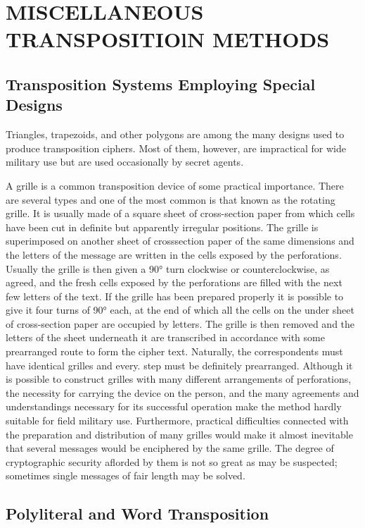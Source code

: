 \section{MISCELLANEOUS TRANSPOSITIOlN METHODS}
\subsection{Transposition Systems Employing Special Designs}

\mypara Triangles, trapezoids, and other polygons are among the many
designs used to produce transposition ciphers. Most of them, however,
are impractical for wide military use but are used occasionally by secret
agents.

\mypara A grille is a common transposition device of some practical importance. There are several types and one of the most common is that known
as the rotating grille. It is usually made of a square sheet of cross-section paper from which cells have been cut in definite but apparently
irregular positions. The grille is superimposed on another sheet of crosssection paper of the same dimensions and the letters of the message are
written in the cells exposed by the perforations. Usually the grille is
then given a 90° turn clockwise or counterclockwise, as agreed, and the
fresh cells exposed by the perforations are filled with the next few letters
of the text. If the grille has been prepared properly it is possible to give it
four turns of 90° each, at the end of which all the cells on the under
sheet of cross-section paper are occupied by letters. The grille is then
removed and the letters of the sheet underneath it are transcribed in
accordance with some prearranged route to form the cipher text. Naturally, the correspondents must have identical grilles and every. step must
be definitely prearranged. Although it is possible to construct grilles with
many different arrangements of perforations, the necessity for carrying
the device on the person, and the many agreements and understandings
necessary for its successful operation make the method hardly suitable
for field military use. Furthermore, practical difficulties connected with
the preparation and distribution of many grilles would make it almost
inevitable that several messages would be enciphered by the same grille.
The degree of cryptographic security aﬂorded by them is not so great as
may be suspected; sometimes single messages of fair length may
be solved.

\subsection{Polyliteral and Word Transposition}

